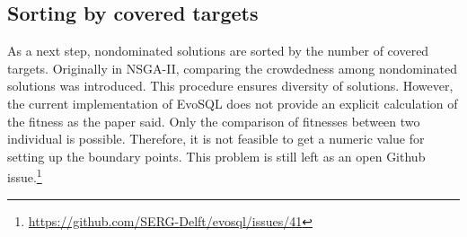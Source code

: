 \subsection{Sorting by covered targets}
As a next step, nondominated solutions are sorted by the number of covered targets. Originally in NSGA-II, comparing the crowdedness among nondominated solutions was introduced. This procedure ensures diversity of solutions. However, the current implementation of EvoSQL does not provide an explicit calculation of the fitness as the paper said. Only the comparison of fitnesses between two individual is possible. Therefore, it is not feasible to get a numeric value for setting up the boundary points. This problem is still left as an open Github issue.\footnote[1]{\href{https://github.com/SERG-Delft/evosql/issues/41}{https://github.com/SERG-Delft/evosql/issues/41}}



